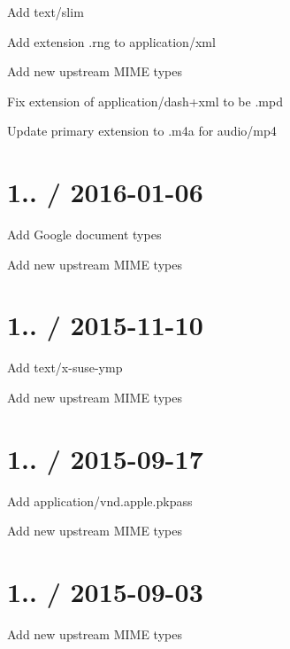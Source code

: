 \begin{DoxyItemize}
\item Add {\ttfamily text/slim}
\item Add extension {\ttfamily .rng} to {\ttfamily application/xml}
\item Add new upstream M\+I\+ME types
\item Fix extension of {\ttfamily application/dash+xml} to be {\ttfamily .mpd}
\item Update primary extension to {\ttfamily .m4a} for {\ttfamily audio/mp4}
\end{DoxyItemize}

\section*{1.. / 2016-\/01-\/06 }


\begin{DoxyItemize}
\item Add Google document types
\item Add new upstream M\+I\+ME types
\end{DoxyItemize}

\section*{1.. / 2015-\/11-\/10 }


\begin{DoxyItemize}
\item Add {\ttfamily text/x-\/suse-\/ymp}
\item Add new upstream M\+I\+ME types
\end{DoxyItemize}

\section*{1.. / 2015-\/09-\/17 }


\begin{DoxyItemize}
\item Add {\ttfamily application/vnd.\+apple.\+pkpass}
\item Add new upstream M\+I\+ME types
\end{DoxyItemize}

\section*{1.. / 2015-\/09-\/03 }


\begin{DoxyItemize}
\item Add new upstream M\+I\+ME types
\end{DoxyItemize}

